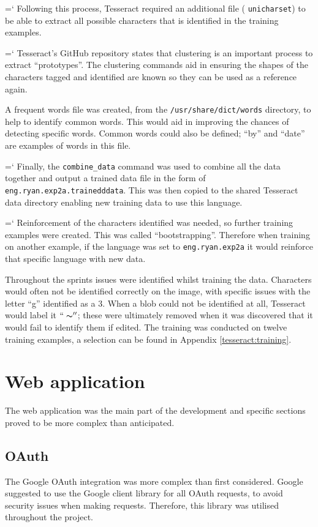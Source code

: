 {{{{{\ttfamily \hyphenchar\the\font=`\-}%
Following this process, Tesseract required an additional file ( \texttt{unicharset}) to be able to extract all possible characters that is identified in the training examples.

{{\ttfamily \hyphenchar\the\font=`\-}%
Tesseract's GitHub repository states that clustering is an important process to extract ``prototypes''. The clustering commands aid in ensuring the shapes of the characters tagged and identified are known so they can be used as a reference again.

A frequent words file was created, from the \texttt{/usr/share/dict/words} directory, to help to identify common words. This would aid in improving the chances of detecting specific words. Common words could also be defined; ``by'' and ``date'' are examples of words in this file.

{{\ttfamily \hyphenchar\the\font=`\-}%
Finally, the \texttt{combine\_data} command was used to combine all the data together and output a trained data file in the form of \texttt{eng.ryan.exp2a.trainedddata}. This was then copied to the shared Tesseract data directory enabling new training data to use this language.

{{\ttfamily \hyphenchar\the\font=`\-}%
Reinforcement of the characters identified was needed, so further training examples were created. This was called ``bootstrapping''. Therefore when training on another example, if the language was set to \texttt{eng.ryan.exp2a} it would reinforce that specific language with new data.

Throughout the sprints issues were identified whilst training the data. Characters would often not be identified correctly on the image, with specific issues with the letter ``g''  identified as a 3. When a blob could not be identified at all, Tesseract would label it $``\thicksim''$; these were ultimately removed when it was discovered that it would fail to identify them if edited. The training was conducted on twelve training examples, a selection can be found in Appendix \ref{tesseract:training}.

\section{Web application}
The web application was the main part of the development and specific sections proved to be more complex than anticipated.

\subsection{OAuth}\label{app:oauth}
The Google OAuth integration was more complex than first considered. Google suggested to use the Google client library \cite{citeulike:14024993} for all OAuth requests, to avoid security issues when making requests. Therefore, this library was utilised throughout the project.

}}}}}}}
